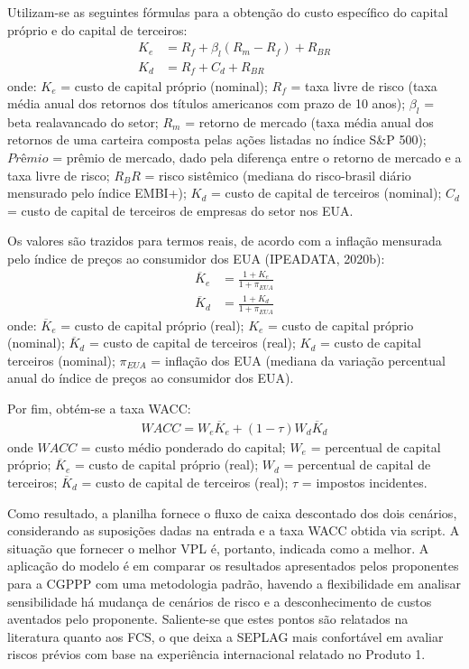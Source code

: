 Utilizam-se as seguintes fórmulas para a obtenção do custo específico do capital próprio e do capital de terceiros:
\begin{align}
    K_e&=R_f+\beta_l(R_m-R_f)+R_{BR} \\
    K_d&=R_f+C_d+R_{BR}
\end{align}
onde: $K_e$ = custo de capital próprio (nominal); $R_f$ = taxa livre de risco (taxa média anual dos retornos dos títulos americanos com prazo de 10 anos); $\beta_l$ = beta realavancado do setor; $R_m$ = retorno de mercado (taxa média anual dos retornos de uma carteira composta pelas ações listadas no índice S&P 500); $Prêmio$ = prêmio de mercado, dado pela diferença entre o retorno de mercado e a taxa livre de risco; $R_BR$ = risco sistêmico (mediana do risco-brasil diário mensurado pelo índice EMBI+); $K_d$ = custo de capital de terceiros (nominal); $C_d$ = custo de capital de terceiros de empresas do setor nos EUA.

Os valores são trazidos para termos reais, de acordo com a inflação mensurada pelo índice de preços ao consumidor dos EUA (IPEADATA, 2020b):
\begin{align}
    \overline{K}_e&=\frac{1+K_e}{1+\pi_{EUA}} \\
    \overline{K}_d&=\frac{1+K_d}{1+\pi_{EUA}}
\end{align}
onde: $\overline{K}_e$ = custo de capital próprio (real);  $K_e$ = custo de capital próprio (nominal); $\overline{K}_d$ = custo de capital de terceiros (real); $K_d$ = custo de capital terceiros (nominal); $\pi_{EUA}$ = inflação dos EUA (mediana da variação percentual anual do índice de preços ao consumidor dos EUA).

Por fim, obtém-se a taxa WACC:
\begin{align}
    WACC=W_e\overline{K}_e+(1-\tau)W_d\overline{K}_d
\end{align}
onde $WACC$ = custo médio ponderado do capital; $W_e$ = percentual de capital próprio; $\overline{K}_e$ = custo de capital próprio (real); $W_d$ = percentual de capital de terceiros; $\overline{K}_d$ = custo de capital de terceiros (real); $\tau$ = impostos incidentes.

Como resultado, a planilha fornece o fluxo de caixa descontado dos dois cenários, considerando as suposições dadas na entrada e a taxa WACC obtida via script. A situação que fornecer o melhor VPL é, portanto, indicada como a melhor. A aplicação do modelo é em comparar os resultados apresentados pelos proponentes para a CGPPP com uma metodologia padrão, havendo a flexibilidade em analisar sensibilidade há mudança de cenários de risco e a desconhecimento de custos aventados pelo proponente. Saliente-se que estes pontos são relatados na literatura quanto aos FCS, o que deixa a SEPLAG mais confortável em avaliar riscos prévios com base na experiência internacional relatado no Produto 1.






